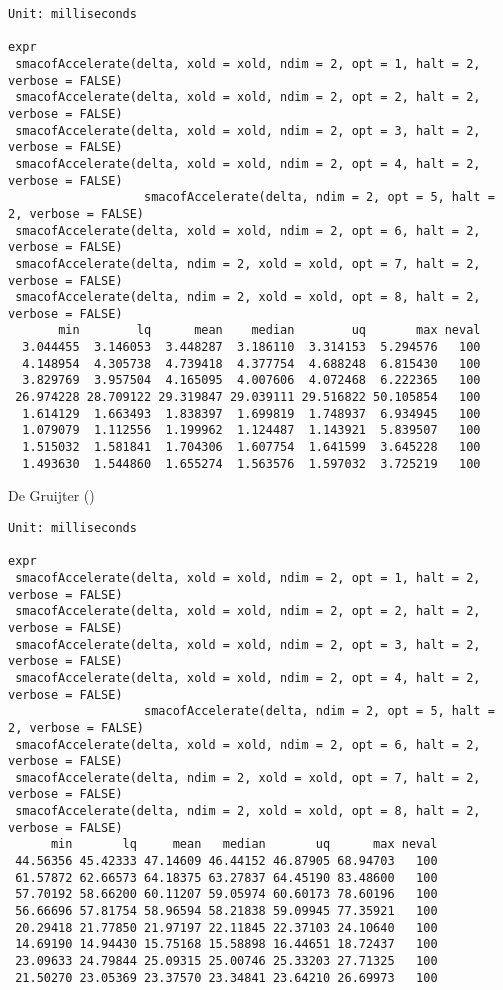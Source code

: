 \documentclass[
  12pt,
  letterpaper,
  DIV=11,
  numbers=noendperiod]{scrartcl}
\begin{document}
\begin{verbatim}
Unit: milliseconds
                                                                                    expr
 smacofAccelerate(delta, xold = xold, ndim = 2, opt = 1, halt = 2,      verbose = FALSE)
 smacofAccelerate(delta, xold = xold, ndim = 2, opt = 2, halt = 2,      verbose = FALSE)
 smacofAccelerate(delta, xold = xold, ndim = 2, opt = 3, halt = 2,      verbose = FALSE)
 smacofAccelerate(delta, xold = xold, ndim = 2, opt = 4, halt = 2,      verbose = FALSE)
                   smacofAccelerate(delta, ndim = 2, opt = 5, halt = 2, verbose = FALSE)
 smacofAccelerate(delta, xold = xold, ndim = 2, opt = 6, halt = 2,      verbose = FALSE)
 smacofAccelerate(delta, ndim = 2, xold = xold, opt = 7, halt = 2,      verbose = FALSE)
 smacofAccelerate(delta, ndim = 2, xold = xold, opt = 8, halt = 2,      verbose = FALSE)
       min        lq      mean    median        uq       max neval
  3.044455  3.146053  3.448287  3.186110  3.314153  5.294576   100
  4.148954  4.305738  4.739418  4.377754  4.688248  6.815430   100
  3.829769  3.957504  4.165095  4.007606  4.072468  6.222365   100
 26.974228 28.709122 29.319847 29.039111 29.516822 50.105854   100
  1.614129  1.663493  1.838397  1.699819  1.748937  6.934945   100
  1.079079  1.112556  1.199962  1.124487  1.143921  5.839507   100
  1.515032  1.581841  1.704306  1.607754  1.641599  3.645228   100
  1.493630  1.544860  1.655274  1.563576  1.597032  3.725219   100
\end{verbatim}

De Gruijter ()

\begin{verbatim}
Unit: milliseconds
                                                                                    expr
 smacofAccelerate(delta, xold = xold, ndim = 2, opt = 1, halt = 2,      verbose = FALSE)
 smacofAccelerate(delta, xold = xold, ndim = 2, opt = 2, halt = 2,      verbose = FALSE)
 smacofAccelerate(delta, xold = xold, ndim = 2, opt = 3, halt = 2,      verbose = FALSE)
 smacofAccelerate(delta, xold = xold, ndim = 2, opt = 4, halt = 2,      verbose = FALSE)
                   smacofAccelerate(delta, ndim = 2, opt = 5, halt = 2, verbose = FALSE)
 smacofAccelerate(delta, xold = xold, ndim = 2, opt = 6, halt = 2,      verbose = FALSE)
 smacofAccelerate(delta, ndim = 2, xold = xold, opt = 7, halt = 2,      verbose = FALSE)
 smacofAccelerate(delta, ndim = 2, xold = xold, opt = 8, halt = 2,      verbose = FALSE)
      min       lq     mean   median       uq      max neval
 44.56356 45.42333 47.14609 46.44152 46.87905 68.94703   100
 61.57872 62.66573 64.18375 63.27837 64.45190 83.48600   100
 57.70192 58.66200 60.11207 59.05974 60.60173 78.60196   100
 56.66696 57.81754 58.96594 58.21838 59.09945 77.35921   100
 20.29418 21.77850 21.97197 22.11845 22.37103 24.10640   100
 14.69190 14.94430 15.75168 15.58898 16.44651 18.72437   100
 23.09633 24.79844 25.09315 25.00746 25.33203 27.71325   100
 21.50270 23.05369 23.37570 23.34841 23.64210 26.69973   100
\end{verbatim}
\end{document}
